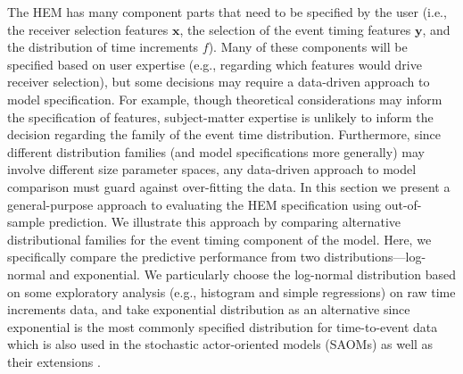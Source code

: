 \documentclass[ba]{imsart}
\numberwithin{equation}{section}
\theoremstyle{plain}
\begin{document}
	The HEM has many component parts that need to be specified by the user (i.e., the receiver selection features $\boldsymbol{x}$, the selection of the event timing features $\boldsymbol{y}$, and the distribution of time increments $f$). Many of these components will be specified based on user expertise (e.g., regarding which features would drive receiver selection), but some decisions may require a data-driven approach to model specification. For example, though theoretical considerations may inform the specification of features, subject-matter expertise is unlikely to inform the decision regarding the family of the event time distribution. Furthermore, since different distribution families (and model specifications more generally) may involve different size parameter spaces, any data-driven approach to model comparison must guard against over-fitting the data. In this section we present a general-purpose approach to evaluating the HEM specification using out-of-sample prediction. We illustrate this approach by comparing alternative distributional families for the event timing component of the model. Here, we specifically compare the predictive performance from two distributions---log-normal and exponential. We particularly choose the log-normal distribution based on some exploratory analysis (e.g., histogram and simple regressions) on raw time increments data, and take exponential distribution as an alternative since exponential is the most commonly specified distribution for time-to-event data which is also used in the stochastic actor-oriented models (SAOMs) \citep{snijders1996stochastic} as well as their extensions \citep{snijders2007modeling}. 
\end{document}
